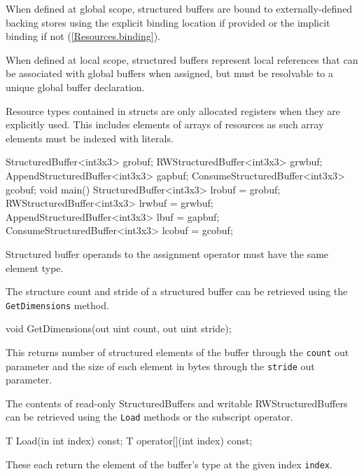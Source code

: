 When defined at global scope, structured buffers are bound to externally-defined backing stores
using the explicit binding location if provided or the implicit binding if not (\ref{Resources.binding}).

When defined at local scope, structured buffers represent local references
that can be associated with global buffers when assigned,
but must be resolvable to a unique global buffer declaration.

\begin{note}
Resource types contained in structs are only allocated registers when they are explicitly used.
This includes elements of arrays of resources as such array elements must be indexed with literals.
\end{note}


\begin{HLSL}
  StructuredBuffer<int3x3> grobuf;
  RWStructuredBuffer<int3x3> grwbuf;
  AppendStructuredBuffer<int3x3> gapbuf;
  ConsumeStructuredBuffer<int3x3> gcobuf;
  void main() {
    StructuredBuffer<int3x3> lrobuf = grobuf;
    RWStructuredBuffer<int3x3> lrwbuf = grwbuf;
    AppendStructuredBuffer<int3x3> lbuf = gapbuf;
    ConsumeStructuredBuffer<int3x3> lcobuf = gcobuf;
  }
\end{HLSL}
Structured buffer operands to the assignment operator must have the same element type.


The structure count and stride of a structured buffer can be retrieved using the \texttt{GetDimensions} method.
\begin{HLSL}
void GetDimensions(out uint count, out uint stride);
\end{HLSL}

This returns number of structured elements of the buffer through the \texttt{count} out parameter
and the size of each element in bytes through the \texttt{stride} out parameter.


The contents of read-only StructuredBuffers and writable RWStructuredBuffers can be retrieved
using the \texttt{Load} methods or the subscript operator.

\begin{HLSL}
 T Load(in int index) const;
 T operator[](int index) const;
\end{HLSL}

These each return the element of the buffer's type at the given index \texttt{index}.

